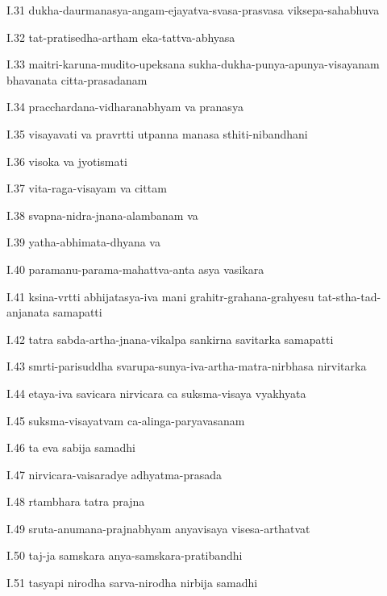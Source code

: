 I.31
dukha-daurmanasya-angam-ejayatva-svasa-prasvasa viksepa-sahabhuva

I.32
tat-pratisedha-artham eka-tattva-abhyasa

I.33
maitri-karuna-mudito-upeksana sukha-dukha-punya-apunya-visayanam
bhavanata citta-prasadanam

I.34
pracchardana-vidharanabhyam va pranasya

I.35
visayavati va pravrtti utpanna manasa sthiti-nibandhani

I.36
visoka va jyotismati

I.37
vita-raga-visayam va cittam

I.38
svapna-nidra-jnana-alambanam va

I.39
yatha-abhimata-dhyana va

I.40
paramanu-parama-mahattva-anta asya vasikara

I.41
ksina-vrtti abhijatasya-iva mani
grahitr-grahana-grahyesu tat-stha-tad-anjanata samapatti

I.42
tatra sabda-artha-jnana-vikalpa sankirna savitarka samapatti

I.43
smrti-parisuddha svarupa-sunya-iva-artha-matra-nirbhasa nirvitarka

I.44
etaya-iva savicara nirvicara ca suksma-visaya vyakhyata

I.45
suksma-visayatvam ca-alinga-paryavasanam

I.46
ta eva sabija samadhi

I.47
nirvicara-vaisaradye adhyatma-prasada

I.48
rtambhara tatra prajna

I.49
sruta-anumana-prajnabhyam anyavisaya visesa-arthatvat

I.50
taj-ja samskara anya-samskara-pratibandhi

I.51
tasyapi nirodha sarva-nirodha nirbija samadhi
